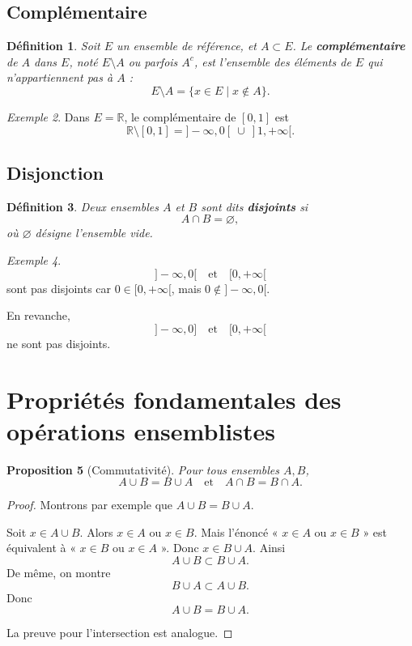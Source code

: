 \documentclass[11pt,a4paper]{article}
\newtheorem{definition}{Définition}[section]
\newtheorem{proposition}[definition]{Proposition}
\theoremstyle{remark}
\newtheorem{exemple}[definition]{Exemple}
\newcommand{\R}{\mathbb{R}}
\begin{document}
\subsection{Complémentaire}

\begin{definition}
Soit \(E\) un ensemble de référence, et \(A\subset E\). Le \textbf{complémentaire} de \(A\) dans \(E\), noté \(E\setminus A\) ou parfois \(A^c\), est l’ensemble des éléments de \(E\) qui n’appartiennent pas à \(A\) :
\[
E\setminus A=\{x\in E\mid x\notin A\}.
\]
\end{definition}

\begin{exemple}
Dans \(E=\R\), le complémentaire de \([0,1]\) est
\[
\R\setminus [0,1]=]-\infty,0[\ \cup\ ]1,+\infty[.
\]
\end{exemple}

\subsection{Disjonction}

\begin{definition}
Deux ensembles \(A\) et \(B\) sont dits \textbf{disjoints} si
\[
A\cap B=\varnothing,
\]
où \(\varnothing\) désigne l’ensemble vide.
\end{definition}

\begin{exemple}
\[
]-\infty,0[ \quad \text{et} \quad [0,+\infty[
\]
sont pas disjoints car \(0\in [0,+\infty[\), mais \(0\notin ]-\infty,0[\).

En revanche,
\[
]-\infty,0]
\quad \text{et} \quad
[0,+\infty[
\]
ne sont pas disjoints.
\end{exemple}

\section{Propriétés fondamentales des opérations ensemblistes}

\begin{proposition}[Commutativité]
Pour tous ensembles \(A,B\),
\[
A\cup B=B\cup A
\quad \text{et} \quad
A\cap B=B\cap A.
\]
\end{proposition}

\begin{proof}
Montrons par exemple que \(A\cup B=B\cup A\).

Soit \(x\in A\cup B\). Alors \(x\in A\) ou \(x\in B\). Mais l’énoncé « \(x\in A\) ou \(x\in B\) » est équivalent à « \(x\in B\) ou \(x\in A\) ». Donc \(x\in B\cup A\). Ainsi
\[
A\cup B\subset B\cup A.
\]
De même, on montre
\[
B\cup A\subset A\cup B.
\]
Donc
\[
A\cup B=B\cup A.
\]

La preuve pour l’intersection est analogue.
\end{proof}
\end{document}

